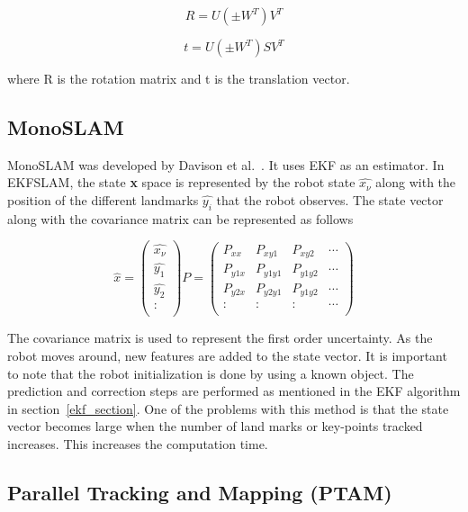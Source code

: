 \begin{equation}
	R = U(\pm W^T)V^T
\end{equation}

\begin{equation}	
	t = U(\pm W^T)SV^T
\end{equation}

where R is the rotation matrix and t is the translation vector. 

\subsection{MonoSLAM}

MonoSLAM was developed by Davison et al.~\cite{davison2003real,davison2007monoslam}. It uses EKF as an estimator. In EKFSLAM, the state \textbf{x} space is represented by the robot state $\hat{x_\nu}$ along with the position of the different landmarks $\hat{y_i}$ that the robot observes. The state vector along with the covariance matrix can be represented as follows

\begin{equation}
\hat{x} = 
\begin{pmatrix}
  \hat{x_\nu} \\
  \hat{y_1} \\
  \hat{y_2} \\
  : 	\\
 \end{pmatrix}
P = 
\begin{pmatrix}
  P_{xx} & P_{xy1} & P_{xy2} & \cdots \\
  P_{y1x} & P_{y1y1} & P_{y1y2} & \cdots \\
  P_{y2x} & P_{y2y1} & P_{y1y2} & \cdots \\
  : & :     &     :     & \cdots \\
 \end{pmatrix}
\end{equation}

The covariance matrix is used to represent the first order uncertainty. As the robot moves around, new features are added to the state vector. It is important to note that the robot initialization is done by using a known object. The prediction and correction steps are performed as mentioned in the EKF algorithm in section~\ref{ekf_section}. One of the problems with this method is that the state vector becomes large when the number of land marks or key-points tracked increases. This increases the computation time.

\subsection{Parallel Tracking and Mapping (PTAM)}
\label{ptamtheory}

